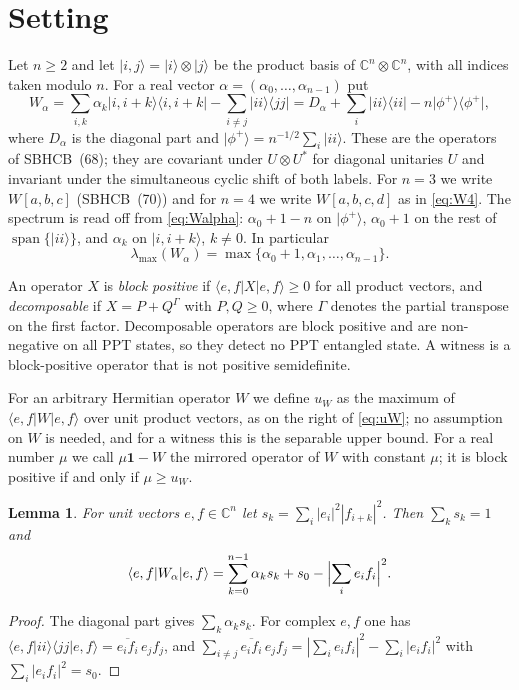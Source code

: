 \documentclass[11pt,a4paper]{article}
\newtheorem{lemma}[theorem]{Lemma}
\theoremstyle{remark}
\newcommand{\ket}[1]{\lvert #1\rangle}
\newcommand{\bra}[1]{\langle #1\rvert}
\newcommand{\ketbra}[2]{\lvert #1\rangle\langle #2\rvert}
\newcommand{\id}{\mathbf{1}}
\newcommand{\G}{\Gamma}
\newcommand{\uW}{u_W}
\newcommand{\lmax}{\lambda_{\max}}
\begin{document}
\section{Setting}\label{sec:setting}

Let $n\ge2$ and let $\ket{i,j}=\ket i\otimes\ket j$ be the product basis of
$\mathbb{C}^n\otimes\mathbb{C}^n$, with all indices taken modulo $n$. For a real vector
$\alpha=(\alpha_0,\dots,\alpha_{n-1})$ put
\begin{equation}\label{eq:Walpha}
W_\alpha=\sum_{i,k}\alpha_k\ketbra{i,i+k}{i,i+k}-\sum_{i\neq j}\ketbra{ii}{jj}
=D_\alpha+\sum_i\ketbra{ii}{ii}-n\ketbra{\phi^+}{\phi^+},
\end{equation}
where $D_\alpha$ is the diagonal part and $\ket{\phi^+}=n^{-1/2}\sum_i\ket{ii}$. These are
the operators of SBHCB~(68); they are covariant under $U\otimes U^{*}$ for diagonal
unitaries $U$ and invariant under the simultaneous cyclic shift of both labels. For $n=3$
we write $W[a,b,c]$ (SBHCB~(70)) and for $n=4$ we write $W[a,b,c,d]$ as in
\eqref{eq:W4}. The spectrum is read off from \eqref{eq:Walpha}: $\alpha_0+1-n$ on
$\ket{\phi^+}$, $\alpha_0+1$ on the rest of $\operatorname{span}\{\ket{ii}\}$, and
$\alpha_k$ on $\ket{i,i+k}$, $k\neq0$. In particular
\begin{equation}\label{eq:lmax}
\lmax(W_\alpha)=\max\{\alpha_0+1,\alpha_1,\dots,\alpha_{n-1}\}.
\end{equation}

An operator $X$ is \emph{block positive} if $\bra{e,f}X\ket{e,f}\ge0$ for all product
vectors, and \emph{decomposable} if $X=P+Q^{\G}$ with $P,Q\ge0$, where $\G$ denotes the
partial transpose on the first factor. Decomposable operators are block positive and are
non-negative on all PPT states, so they detect no PPT entangled state. A witness is a
block-positive operator that is not positive semidefinite.

For an arbitrary Hermitian operator $W$ we define $\uW$ as the maximum of
$\bra{e,f}W\ket{e,f}$ over unit product vectors, as on the right of \eqref{eq:uW}; no
assumption on $W$ is needed, and for a witness this is the separable upper bound. For a
real number $\mu$ we call $\mu\id-W$ the mirrored operator of $W$ with constant $\mu$; it
is block positive if and only if $\mu\ge\uW$.

\begin{lemma}\label{lem:prod}
For unit vectors $e,f\in\mathbb{C}^n$ let $s_k=\sum_i|e_i|^2|f_{i+k}|^2$. Then
$\sum_ks_k=1$ and
\begin{equation}\label{eq:prodval}
\bra{e,f}W_\alpha\ket{e,f}=\sum_{k=0}^{n-1}\alpha_ks_k+s_0-\Bigl|\sum_ie_if_i\Bigr|^{2}.
\end{equation}
\end{lemma}
\begin{proof}
The diagonal part gives $\sum_k\alpha_ks_k$. For complex $e,f$ one has
$\bra{e,f}ii\rangle\langle jj\ket{e,f}=\overline{e_if_i}\,e_jf_j$, and
$\sum_{i\neq j}\overline{e_if_i}\,e_jf_j=|\sum_ie_if_i|^2-\sum_i|e_if_i|^2$ with
$\sum_i|e_if_i|^2=s_0$.
\end{proof}
\end{document}
